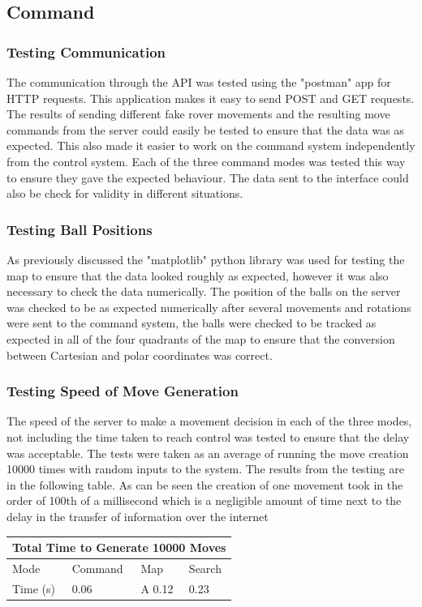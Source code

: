 \documentclass[10pt,twoside]{article}
\begin{document}
\newpage

\subsection{Command}
\subsubsection{Testing Communication}
The communication through the API was tested using the "postman" app for HTTP requests. This application makes it easy to send POST and GET requests. The results of sending different fake rover movements and the resulting move commands from the server could easily be tested to ensure that the data was as expected. This also made it easier to work on the command system independently from the control system. Each of the three command modes was tested this way to ensure they gave the expected behaviour. The data sent to the interface could also be check for validity in different situations.
\subsubsection{Testing Ball Positions}
As previously discussed the "matplotlib" python library was used for testing the map to ensure that the data looked roughly as expected, however it was also necessary to check the data numerically. The position of the balls on the server was checked to be as expected numerically after several movements and rotations were sent to the command system, the balls were checked to be tracked as expected in all of the four quadrants of the map to ensure that the conversion between Cartesian and polar coordinates was correct.  
\subsubsection{Testing Speed of Move Generation}
The speed of the server to make a movement decision in each of the three modes, not including the time taken to reach control was tested to ensure that the delay was acceptable. The tests were taken as an average of running the move creation 10000 times with random inputs to the system. The results from the testing are in the following table. As can be seen the creation of one movement took in the order of 100th of a millisecond which is a negligible amount of time next to the delay in the transfer of information over the internet
\begin{center}
\begin{tabular}{ |p{3cm}||p{3cm}|p{3cm}|p{3cm}|  }
 \hline
 \multicolumn{4}{|c|}{Total Time to Generate 10000 Moves} \\
 \hline
 Mode & Command & Map & Search\\
 \hline
 Time (s)  & 0.06    &A 0.12 &   0.23\\
 \hline
\end{tabular}
\end{center}
\end{document}
